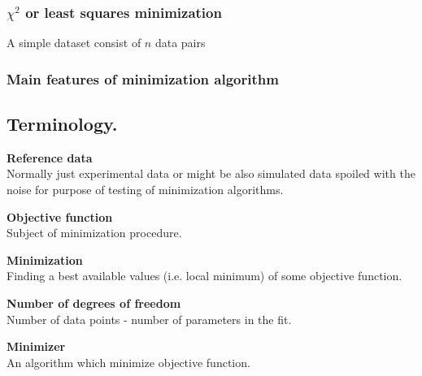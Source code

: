 \subsubsection*{$\chi^2$ or least squares minimization}
A simple dataset consist of $n$ data pairs 

\subsubsection*{Main features of minimization algorithm}



\subsection{Terminology.}

\noindent
{\bf Reference data} \\
Normally just experimental data or might be also simulated data
spoiled with the noise for purpose of testing of minimization algorithms.
\vspace*{1mm}

\noindent
{\bf Objective function} \\
Subject of minimization procedure.
\vspace*{1mm}

\noindent
{\bf Minimization} \\
Finding a best available values (i.e. local minimum) of some objective function. 
\vspace*{1mm}

\noindent
{\bf Number of degrees of freedom} \\
Number of data points - number of parameters in the fit.
\vspace*{1mm}

\noindent
{\bf Minimizer} \\
An algorithm which minimize objective function. 

